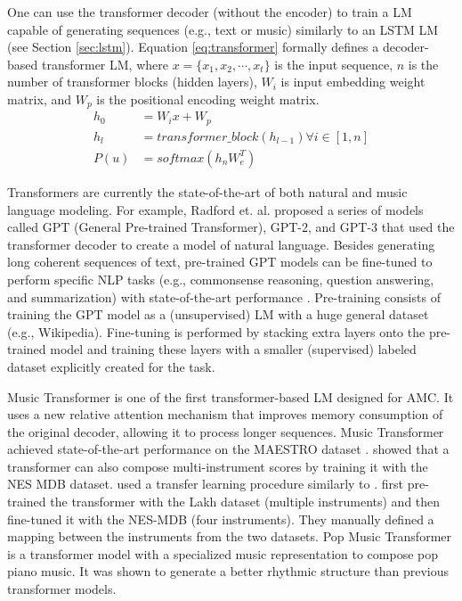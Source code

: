 One can use the transformer decoder (without the encoder) to train a LM capable of generating sequences (e.g., text or music) similarly to an LSTM LM (see Section \ref{sec:lstm}). Equation \ref{eq:transformer} formally defines a decoder-based transformer LM, where $x = \{x_1, x_2, \cdots, x_t\}$ is the input sequence, $n$ is the number of transformer blocks (hidden layers), $W_i$ is input embedding weight matrix, and $W_p$ is the positional encoding weight matrix.
\begin{equation}\label{eq:transformer}
\begin{split}
    h_0 &= W_ix + W_p \\
    h_l &= transformer\_block(h_{l-1}) \forall i \in [1,n] \\
    P(u) &= softmax(h_nW_e^T)
\end{split}
\end{equation}

Transformers are currently the state-of-the-art of both natural and music language modeling. For example, Radford et. al. \cite{Radford2018, radford2019language} proposed a series of models called GPT (General Pre-trained Transformer), GPT-2, and GPT-3 that used the transformer decoder to create a model of natural language. Besides generating long coherent sequences of text, pre-trained GPT models can be fine-tuned to perform specific NLP tasks (e.g., commonsense reasoning, question answering, and summarization) with state-of-the-art performance \cite{radford2019language}. Pre-training consists of training the GPT model as a (unsupervised) LM with a huge general dataset (e.g., Wikipedia). Fine-tuning is performed by stacking extra layers onto the pre-trained model and training these layers with a smaller (supervised) labeled dataset explicitly created for the task.

Music Transformer \cite{huang2018music} is one of the first transformer-based LM designed for AMC. It uses a new relative attention mechanism that improves memory consumption of the original decoder, allowing it to process longer sequences. Music Transformer achieved state-of-the-art performance on the MAESTRO dataset \cite{hawthorne2018enabling}. \citet{donahue2019lakhnes} showed that a transformer can also compose multi-instrument scores by training it with the NES MDB \cite{donahue2018nesmdb} dataset. \citet{donahue2018nesmdb} used a transfer learning procedure similarly to \citet{Radford2018}. \citet{donahue2018nesmdb} first pre-trained the transformer with the Lakh dataset (multiple instruments) and then fine-tuned it with the NES-MDB (four instruments). They manually defined a mapping between the instruments from the two datasets. Pop Music Transformer \cite{huang2020pop} is a transformer model with a specialized music representation to compose pop piano music. It was shown to generate a better rhythmic structure than previous transformer models.

